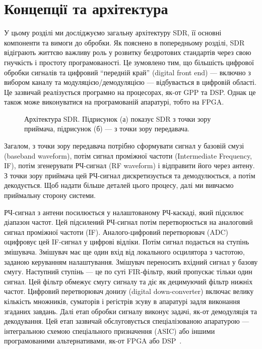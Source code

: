 \documentclass[journal]{IEEEtran}
\begin{document}
\section{Концепції та архітектура}
\label{sdr}

У цьому розділі ми досліджуємо загальну архітектуру SDR, її основні компоненти та вимоги до обробки. Як пояснено в попередньому розділі, SDR відіграють життєво важливу роль у розвитку бездротових стандартів через свою гнучкість і простоту програмованості. Це зумовлено тим, що більшість цифрової обробки сигналів та цифровий ``передній край'' (digital front end) — включно з вибором каналу та модуляцією/демодуляцією — відбувається в цифровій області. Це зазвичай реалізується програмно на процесорах, як-от GPP та DSP. Однак це також може виконуватися на програмованій апаратурі, тобто на FPGA.

\begin{figure}[!]
\centering
{}
\caption{Архітектура SDR. Підрисунок (а) показує SDR з точки зору приймача, підрисунок (б) — з точки зору передавача.}
\label{sdr_combined}
\end{figure}

Загалом, з точки зору передавача потрібно сформувати сигнал у базовій смузі (baseband waveform), потім сигнал проміжної частоти (Intermediate Frequency, IF), потім згенерувати РЧ-сигнал (RF waveform) і відправити його через антену.
З точки зору приймача цей РЧ-сигнал дискретизується та демодулюється, а потім декодується.
Щоб надати більше деталей цього процесу, далі ми вивчаємо приймальну сторону системи.


РЧ-сигнал з антени посилюється у налаштованому РЧ-каскаді, який підсилює діапазон частот. Цей підсилений РЧ-сигнал потім перетворюється на аналоговий сигнал проміжної частоти (IF). Аналого-цифровий перетворювач (ADC) оцифровує цей IF-сигнал у цифрові відліки. Потім сигнал подається на ступінь змішувача. Змішувач має ще один вхід від локального осцилятора з частотою, заданою керуванням налаштування.
Змішувач переносить вхідний сигнал у базову смугу.
Наступний ступінь — це по суті FIR-фільтр, який пропускає тільки один сигнал.
Цей фільтр обмежує смугу сигналу та діє як децимуючий фільтр нижніх частот.
Цифровий перетворювач донизу (digital down-converter) включає велику кількість множників, суматорів і регістрів зсуву в апаратурі задля виконання згаданих завдань.
Далі етап обробки сигналу виконує задачі, як-от демодуляція та декодування.
Цей етап зазвичай обслуговується спеціалізованою апаратурою — інтегральною схемою спеціального призначення (ASIC) або іншими програмованими альтернативами, як-от FPGA або DSP~\cite{Haghighat2002a}.
\end{document}

